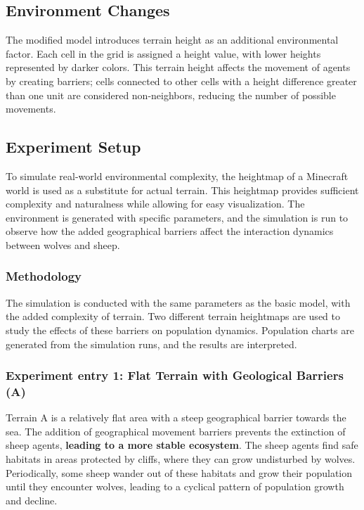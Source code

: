 \documentclass[12pt,a4paper]{article}
\begin{document}
\subsection{Environment Changes}
The modified model introduces terrain height as an additional environmental factor. Each cell in the grid is assigned a height value, with lower heights represented by darker colors. This terrain height affects the movement of agents by creating barriers; cells connected to other cells with a height difference greater than one unit are considered non-neighbors, reducing the number of possible movements.

\subsection{Experiment Setup}
To simulate real-world environmental complexity, the heightmap of a Minecraft world is used as a substitute for actual terrain. This heightmap provides sufficient complexity and naturalness while allowing for easy visualization. The environment is generated with specific parameters, and the simulation is run to observe how the added geographical barriers affect the interaction dynamics between wolves and sheep.

\subsubsection{Methodology}
The simulation is conducted with the same parameters as the basic model, with the added complexity of terrain. Two different terrain heightmaps are used to study the effects of these barriers on population dynamics. Population charts are generated from the simulation runs, and the results are interpreted.

\subsubsection{Experiment entry 1: Flat Terrain with Geological Barriers (A)}
Terrain A is a relatively flat area with a steep geographical barrier towards the sea. The addition of geographical movement barriers prevents the extinction of sheep agents, \textbf{leading to a more stable ecosystem}. The sheep agents find safe habitats in areas protected by cliffs, where they can grow undisturbed by wolves. Periodically, some sheep wander out of these habitats and grow their population until they encounter wolves, leading to a cyclical pattern of population growth and decline.
\end{document}
